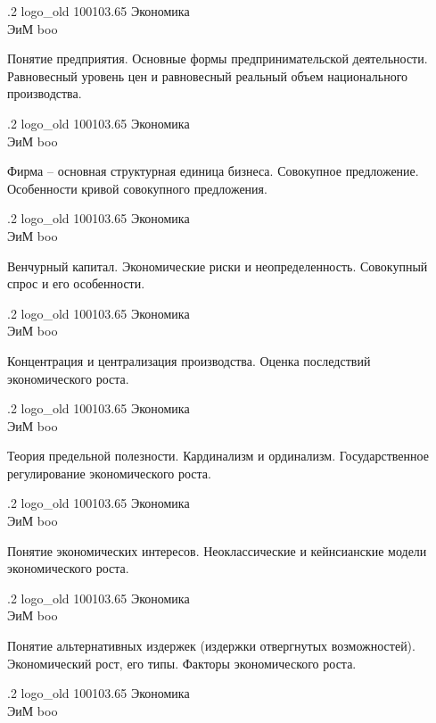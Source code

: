 \documentclass[
	12pt,
	a4paper,
	]
	{article}
\newcommand{\shapkFull}{
	\shapk
		{.2}
		{logo_old}
		{100103.65}
		{Экономика\\}
		{ЭиМ}
		{boo}
}
\begin{document}
\newpage


\shapkFull
\setcounter{zad}{0}

\z 	Понятие предприятия. Основные формы предпринимательской деятельности.
 \medskip
\z 	Равновесный уровень цен и равновесный реальный объем национального производства.
 \medskip

\newpage


\shapkFull
\setcounter{zad}{0}

\z 	Фирма – основная структурная единица бизнеса.
 \medskip
\z 	Совокупное предложение. Особенности кривой совокупного предложения.
 \medskip

\newpage


\shapkFull
\setcounter{zad}{0}

\z 	Венчурный капитал. Экономические риски и неопределенность.
 \medskip
\z 	Совокупный спрос и его особенности.
 \medskip

\newpage


\shapkFull
\setcounter{zad}{0}

\z 	Концентрация и централизация производства.
 \medskip
\z 	Оценка последствий экономического роста.
 \medskip

\newpage


\shapkFull
\setcounter{zad}{0}

\z 	Теория предельной полезности.  Кардинализм и ординализм.
 \medskip
\z 	Государственное регулирование экономического роста.
 \medskip

\newpage


\shapkFull
\setcounter{zad}{0}

\z 	Понятие экономических интересов.
 \medskip
\z 	Неоклассические и кейнсианские модели экономического роста.
 \medskip

\newpage


\shapkFull
\setcounter{zad}{0}

\z 	Понятие альтернативных издержек (издержки отвергнутых возможностей).
 \medskip
\z 	Экономический рост, его типы.  Факторы экономического роста.
 \medskip

\newpage


\shapkFull
\setcounter{zad}{0}
\end{document}
